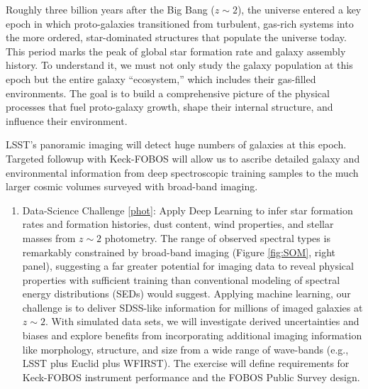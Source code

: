 \documentclass[oneside,11pt]{amsart}
\newcounter{chalno}
\newcommand{\chal}[1]{\refstepcounter{chalno}\label{#1}}
\begin{document}
Roughly three billion years after the Big Bang ($z \sim 2$), the
universe entered a key epoch in which proto-galaxies transitioned from
turbulent, gas-rich systems into the more ordered, star-dominated
structures that populate the universe today.  This period marks the peak
of global star formation rate and galaxy assembly history.   To
understand it, we must not only study the galaxy population at this
epoch but the entire galaxy ``ecosystem,'' which includes their
gas-filled environments.  The goal is to build a comprehensive picture
of the physical processes that fuel proto-galaxy growth, shape their
internal structure, and influence their environment.

LSST's panoramic imaging will detect huge numbers of galaxies at this
epoch.  Targeted followup with Keck-FOBOS will allow us to ascribe
detailed galaxy and environmental information from deep spectroscopic
training samples to the much larger cosmic volumes surveyed with
broad-band imaging.

\begin{enumerate}[rightmargin=0.2cm,leftmargin=0.2cm]

\chal{phot}
\item[] {\textsf {\large Data-Science Challenge \ref{phot}: Apply Deep Learning to
infer star formation rates and formation histories, dust content, wind
properties, and stellar masses from $z \sim 2$ photometry}}.  The range
of observed spectral types is remarkably constrained by broad-band
imaging (Figure \ref{fig:SOM}, right panel), suggesting a far greater
potential for imaging data to reveal physical properties with sufficient
training than conventional modeling of spectral energy distributions
(SEDs) would suggest.  Applying machine learning, our challenge is to
deliver SDSS-like information for millions of imaged galaxies at $z \sim
2$.  With simulated data sets, we will investigate derived uncertainties
and biases and explore benefits from incorporating additional imaging
information like morphology, structure, and size from a wide range of
wave-bands (e.g., LSST plus Euclid plus WFIRST).  The exercise will
define requirements for Keck-FOBOS instrument performance and the FOBOS
Public Survey design.

\end{enumerate}

\end{document}
